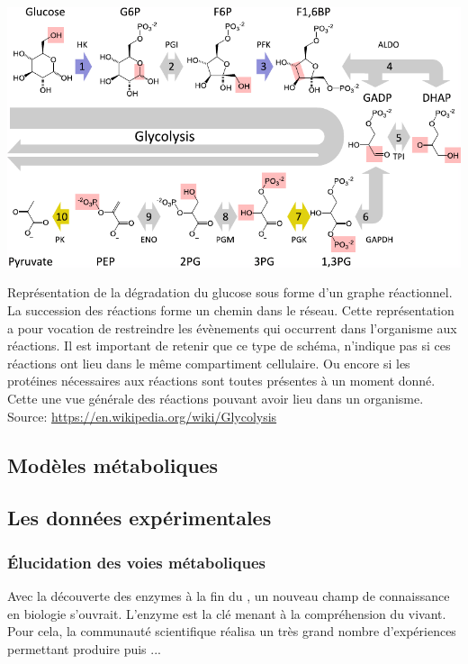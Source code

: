 \begin{refsegment}
    
    \begin{shadedfigure}[H]
        \centering
        \includegraphics[width=\textwidth]{img/graphe_reactions_glycolyse.pdf}
        \caption{Représentation de la dégradation du glucose sous forme d’un graphe réactionnel. La  succession des réactions forme un chemin dans le réseau. Cette représentation a pour vocation de restreindre les évènements qui occurrent dans l'organisme aux réactions. Il est important de retenir que ce type de schéma, n'indique pas si ces réactions ont lieu dans le même compartiment cellulaire. Ou encore si les protéines nécessaires aux réactions sont toutes présentes à un moment donné. Cette une vue générale des réactions pouvant avoir lieu dans un organisme. \hspace{\textwidth}\tiny{Source: \url{https://en.wikipedia.org/wiki/Glycolysis}}  }
        \label{fig:glycolysis}
    \end{shadedfigure}

    \subsection{Modèles métaboliques}
    \subsection{Les données expérimentales}
    \subsubsection{Élucidation des voies métaboliques}
    Avec la découverte des enzymes à la fin du , un nouveau champ de connaissance en biologie s’ouvrait. L’enzyme est la clé menant à la compréhension du vivant. Pour cela, la communauté scientifique réalisa un très grand nombre d’expériences permettant produire puis ...

\end{refsegment}
